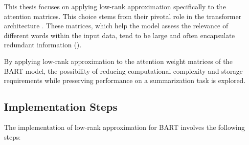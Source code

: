     This thesis focuses on applying low-rank approximation specifically to the attention matrices. This choice stems from their pivotal role in the transformer architecture \cite{vaswani2023attention}. These matrices, which help the model assess the relevance of different words within the input data, tend to be large and often encapsulate redundant information (\cite{aghajanyan2020intrinsic}).

    By applying low-rank approximation to the attention weight matrices of the BART model, the possibility of reducing computational complexity and storage requirements while preserving performance on a summarization task is explored.

    \subsection{Implementation Steps}
        The implementation of low-rank approximation for BART involves the following steps:
